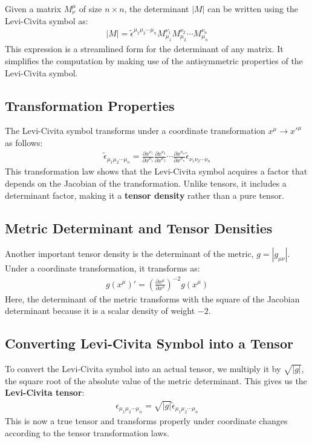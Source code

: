 \documentclass[11pt,letterpaper]{book}
\begin{document}
Given a matrix \( M^\mu_{\nu} \) of size \( n \times n \), the determinant \( |M| \) can be written using the Levi-Civita symbol as:
\begin{align}
|M| = \tilde{\epsilon}^{\mu_1 \mu_2 \cdots \mu_n} M^{\nu_1}_{\mu_1} M^{\nu_2}_{\mu_2} \cdots M^{\nu_n}_{\mu_n}
\end{align}
This expression is a streamlined form for the determinant of any matrix. It simplifies the computation by making use of the antisymmetric properties of the Levi-Civita symbol.

\subsection{Transformation Properties}

The Levi-Civita symbol transforms under a coordinate transformation \( x^{\mu} \rightarrow x'^{\mu} \) as follows:
\begin{align}
\tilde{\epsilon}_{\mu_1 \mu_2 \cdots \mu_n} = \frac{\partial x^{\nu_1}}{\partial x^{\mu_1}} \frac{\partial x^{\nu_2}}{\partial x^{\mu_2}} \cdots \frac{\partial x^{\nu_n}}{\partial x^{\mu_n}} \tilde{\epsilon}_{\nu_1 \nu_2 \cdots \nu_n}
\end{align}
This transformation law shows that the Levi-Civita symbol acquires a factor that depends on the Jacobian of the transformation. Unlike tensors, it includes a determinant factor, making it a \textbf{tensor density} rather than a pure tensor.

\subsection{Metric Determinant and Tensor Densities}

Another important tensor density is the determinant of the metric, \( g = |g_{\mu\nu}| \). Under a coordinate transformation, it transforms as:
\begin{align}
g(x^\mu)' = \left( \frac{\partial x^\mu}{\partial x^\nu} \right)^{-2} g(x^\mu)
\end{align}
Here, the determinant of the metric transforms with the square of the Jacobian determinant because it is a scalar density of weight \( -2 \).

\subsection{Converting Levi-Civita Symbol into a Tensor}

To convert the Levi-Civita symbol into an actual tensor, we multiply it by \( \sqrt{|g|} \), the square root of the absolute value of the metric determinant. This gives us the \textbf{Levi-Civita tensor}:
\begin{align}
\epsilon_{\mu_1 \mu_2 \cdots \mu_n} = \sqrt{|g|} \tilde{\epsilon}_{\mu_1 \mu_2 \cdots \mu_n}
\end{align}
This is now a true tensor and transforms properly under coordinate changes according to the tensor transformation laws.
\end{document}
